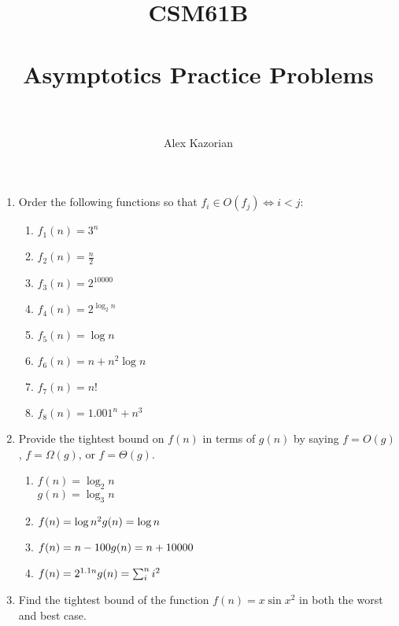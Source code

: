 \documentclass{article}
\title{
	\normalfont \normalsize
	\textsc{CSM61B} \\ [25pt] %
	\horrule{0.5pt} \\[0.4cm] %
	\huge Asymptotics Practice Problems \\ %
	\horrule{2pt} \\[0.5cm] %
}
\author{Alex Kazorian} %
\newenvironment{Questions}[1][Question]
{\begin{enumerate}}
	{\end{enumerate}}
\newcommand{\Question}{\item }
\begin{document}
	\maketitle
	\begin{Questions}
	    \Question
        Order the following functions so that $f_i \in O(f_j) \Longleftrightarrow i < j$:
            \begin{enumerate}
                \item $f_1(n) = 3^n$
                \item $f_2(n) = \frac n 2$
                \item $f_3(n) = 2^{10000}$
                \item $f_4(n) = 2^{\log_2 n}$
                \item $f_5(n) = \log n$
                \item $f_6(n) = n + n^2 \log n$
                \item $f_7(n) = n!$
                \item $f_8(n) = 1.001^n + n^3$
            \end{enumerate}

        \Question
        Provide the tightest bound on $f(n)$ in terms of $g(n)$ by saying $f = O(g)$, $f = \Omega(g)$, or $f = \Theta(g)$.
            \begin{enumerate}
                \item $f(n) = \log_2 n$ \\
                      $g(n) = \log_3 n$
                \item $f(n) = \log n^2 \\
                       g(n) = \log n$
                \item $f(n) = n - 100 \\
                       g(n) = n + 10000$
                \item $f(n) = 2^{1.1n} \\
                       g(n) = \sum_i^n i^2$
            \end{enumerate}

        \Question
        Find the tightest bound of the function $f(n) = x \sin x^2$ in both the worst and best case.


\end{Questions}
\end{document}
